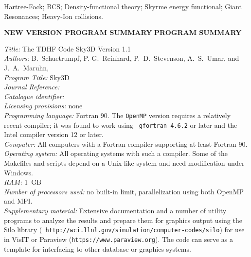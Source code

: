 \documentclass[final,1p,twocolumn]{elsarticle}
\newcounter{bla}
\begin{document}
\begin{frontmatter}
\begin{keyword}
Hartree-Fock; BCS; Density-functional theory; Skyrme energy functional; Giant Resonances;
Heavy-Ion collisions.
\end{keyword}
\end{frontmatter}

{\bf NEW VERSION PROGRAM SUMMARY}
{\bf PROGRAM SUMMARY}

\begin{small}
\noindent
{\em Title:}  The TDHF Code Sky3D Version 1.1\\
{\em Authors:}   B.~Schuetrumpf, P.-G.~Reinhard, P.~D.~Stevenson,
A.~S.~Umar, and J.~A.~Maruhn, \\
{\em Program Title:} Sky3D\\
{\em Journal Reference:}                                      \\
{\em Catalogue identifier:}                                   \\
{\em Licensing provisions:}   none\\
{\em Programming language:} Fortran 90. The {\tt OpenMP} version
requires a relatively recent compiler; it was found to work using {\tt
  gfortran 4.6.2} or later and the Intel compiler version 12 or later.\\
{\em Computer:}   All computers with a Fortran compiler supporting at
least Fortran 90.\\
{\em Operating system:}  All operating systems with such a
compiler. Some of the Makefiles and scripts depend on a Unix-like
system and need modification under Windows.\\
{\em RAM:} 1~GB\\
{\em Number of processors used:} no built-in limit, parallelization
using both OpenMP and MPI.\\
{\em Supplementary material:} Extensive documentation and a number of
utility programs to analyze the results and prepare them for graphics
output using the Silo library ({\tt
  http://wci.llnl.gov/simulation/computer-codes/silo}) for use in VisIT
\cite{HPV:VisIt} or Paraview ({\tt https://www.paraview.org}). The
code can serve as a template for interfacing to other database or graphics systems.  \\

\end{small}
\end{document}
